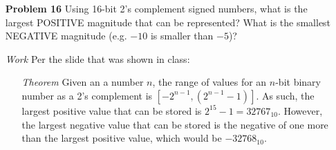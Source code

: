 \documentclass[12pt]{article}
\begin{document}
\begin{enumerate}
  \item[\textbf{Problem 16}] Using 16-bit 2’s complement signed numbers, what is the largest POSITIVE magnitude that can be represented?  What is the smallest NEGATIVE magnitude (e.g. $-10$ is smaller than $-5$)?
\end{enumerate}

\begin{enumerate}
  \item[\textit{Work}] Per the slide that was shown in class:
  \begin{enumerate}
    \item[\textit{Theorem}] Given an a number $n$, the range of values for an $n$-bit binary number as a 2's complement is $[-2^{n-1},(2^{n-1}-1)]$. As such, the largest positive value that can be stored is $2^{15}-1=32767_{10
    }$. However, the largest negative value that can be stored is the negative of one more than the largest positive value, which would be $-32768_{10}$.
  \end{enumerate}
\end{enumerate}
\end{document}
